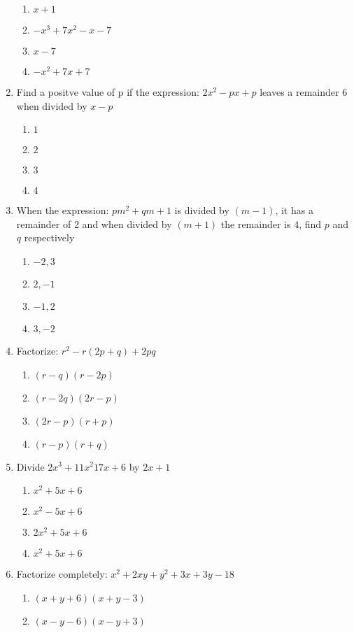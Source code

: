 \begin{multicols}{2}
\begin{enumerate}[label={\arabic*.}]
\begin{enumerate}[label={\Alph*.}]
	\item \(x+1\)
	\item \(-x^3 + 7x^2 -x -7\)
	\item \(x-7\)
	\item \(-x^2 + 7x + 7\)
	\end{enumerate}
\item Find a positve value of p if the expression: $2x^2 - px + p$ leaves a remainder 6 when divided by $x-p$
	\begin{enumerate}[label={\Alph*.}]
	\item \(1\)
	\item \(2\)
	\item \(3\)
	\item \(4\)
	\end{enumerate}
\item When the expression: $pm^2 + qm + 1$ is divided by $(m-1)$, it has a remainder of 2 and when divided by $(m+1)$ the remainder is 4, find $p$ and $q$ respectively
	\begin{enumerate}[label={\Alph*.}]
	\item \(-2,3\)
	\item \(2,-1\)
	\item \(-1,2\)
	\item \(3,-2\)
	\end{enumerate}
\item Factorize: $r^2 - r(2p + q) + 2pq $
	\begin{enumerate}[label={\Alph*.}]
	\item \((r-q)(r-2p)\)
	\item \((r-2q)(2r-p)\)
	\item \((2r - p)(r+p)\)
	\item \((r-p)(r+q)\)
	\end{enumerate}
\item Divide $2x^3 + 11x^2  17x + 6$ by $2x +1$ 
	\begin{enumerate}[label={\Alph*.}]
	\item \(x^2 + 5x + 6\)
	\item \(x^2 - 5x + 6\)
	\item \(2x^2 + 5x + 6\)
	\item \(x^2 + 5x + 6\)
	\end{enumerate}
\item Factorize completely: $x^2 + 2xy + y^2 + 3x + 3y -18$
	\begin{enumerate}[label={\Alph*.}]
	\item \((x+y+6)(x+y-3)\)
	\item \((x-y-6)(x-y+3)\)

\end{enumerate}
\end{enumerate}
\end{multicols}
